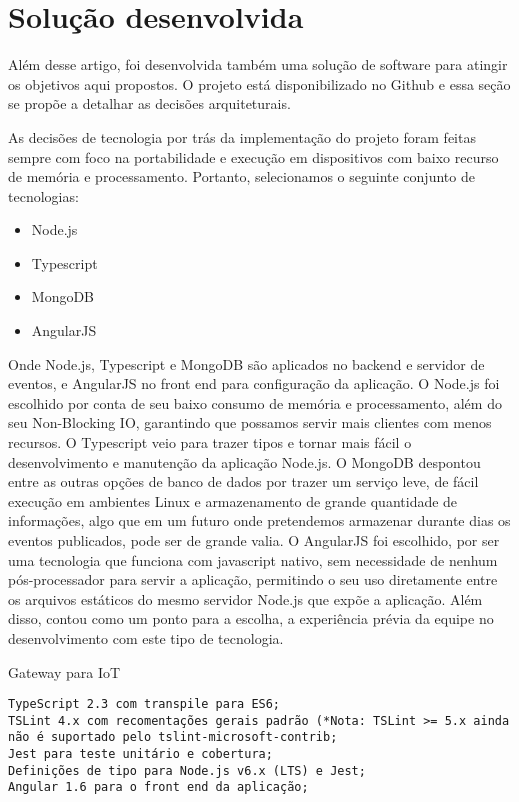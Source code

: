 \section{Solução desenvolvida}
\label{sec:iotGateway}

Além desse artigo, foi desenvolvida também uma solução de software para atingir os objetivos aqui propostos. O projeto está disponibilizado no Github \cite{IoTGatewayGithub} e essa seção se propõe a detalhar as decisões arquiteturais.

As decisões de tecnologia por trás da implementação do projeto foram feitas sempre com foco na portabilidade e execução em dispositivos com baixo recurso de memória e processamento. Portanto, selecionamos o seguinte conjunto de tecnologias:

\begin{itemize}
	\item Node.js \cite{NodeJS}
	\item Typescript \cite{Typescript}
	\item MongoDB \cite{MongoDB}
	\item AngularJS \cite{AngularJS}
\end{itemize}
Onde Node.js, Typescript e MongoDB são aplicados no backend e servidor de eventos, e AngularJS no front end para configuração da aplicação.
O Node.js foi escolhido por conta de seu baixo consumo de memória e processamento, além do seu Non-Blocking IO, garantindo que possamos servir mais clientes com menos recursos. O Typescript veio para trazer tipos e tornar mais fácil o desenvolvimento e manutenção da aplicação Node.js.
O MongoDB despontou entre as outras opções de banco de dados por trazer um serviço leve, de fácil execução em ambientes Linux e armazenamento de grande quantidade de informações, algo que em um futuro onde pretendemos armazenar durante dias os eventos publicados, pode ser de grande valia.
O AngularJS foi escolhido, por ser uma tecnologia que funciona com javascript nativo, sem necessidade de nenhum pós-processador para servir a aplicação, permitindo o seu uso diretamente entre os arquivos estáticos do mesmo servidor Node.js que expõe a aplicação. Além disso, contou como um ponto para a escolha, a experiência prévia da equipe no desenvolvimento com este tipo de tecnologia.

Gateway para IoT
\begin{verbatim}
TypeScript 2.3 com transpile para ES6;
TSLint 4.x com recomentações gerais padrão (*Nota: TSLint >= 5.x ainda não é suportado pelo tslint-microsoft-contrib;
Jest para teste unitário e cobertura;
Definições de tipo para Node.js v6.x (LTS) e Jest;
Angular 1.6 para o front end da aplicação;
\end{verbatim}

